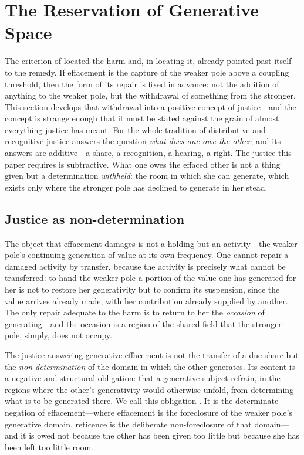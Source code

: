 \section{The Reservation of Generative Space}
\label{p18:sec:reticence}

\noindent
The criterion of  located the harm and, in locating it, already pointed past itself to the remedy. If effacement is the capture of the weaker pole above a coupling threshold, then the form of its repair is fixed in advance: not the addition of anything to the weaker pole, but the withdrawal of something from the stronger. This section develops that withdrawal into a positive concept of justice---and the concept is strange enough that it must be stated against the grain of almost everything justice has meant. For the whole tradition of distributive and recognitive justice answers the question \emph{what does one owe the other}; and its answers are additive---a share, a recognition, a hearing, a right. The justice this paper requires is subtractive. What one owes the effaced other is not a thing given but a determination \emph{withheld}: the room in which she can generate, which exists only where the stronger pole has declined to generate in her stead.

\subsection{Justice as non-determination}
\label{p18:sub:ret-nondetermination}

The object that effacement damages is not a holding but an activity---the weaker pole's continuing generation of value at its own frequency. One cannot repair a damaged activity by transfer, because the activity is precisely what cannot be transferred: to hand the weaker pole a portion of the value one has generated for her is not to restore her generativity but to confirm its suspension, since the value arrives already made, with her contribution already supplied by another. The only repair adequate to the harm is to return to her the \emph{occasion} of generating---and the occasion is a region of the shared field that the stronger pole, simply, does not occupy.

\begin{claim}
The justice answering generative effacement is not the transfer of a due share but the \emph{non-determination} of the domain in which the other generates. Its content is a negative and structural obligation: that a generative subject refrain, in the regions where the other's generativity would otherwise unfold, from determining what is to be generated there. We call this obligation . It is the determinate negation of effacement---where effacement is the foreclosure of the weaker pole's generative domain, reticence is the deliberate non-foreclosure of that domain---and it is owed not because the other has been given too little but because she has been left too little room.
\end{claim}

